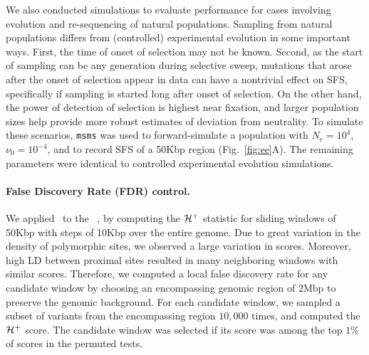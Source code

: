 We also conducted simulations to evaluate performance for cases
involving evolution and re-sequencing of natural populations. Sampling
from natural populations differs from (controlled) experimental
evolution in some important ways. First, the time of onset of
selection may not be known. Second, as the start of sampling can be
any generation during selective sweep, mutations that arose after the
onset of selection appear in data can have a nontrivial effect on SFS,
specifically if sampling is started long after onset of selection. On
the other hand, the power of detection of selection is highest near
fixation, and larger population sizes help provide more robust
estimates of deviation from neutrality. To simulate these scenarios,
\texttt{msms} was used to forward-simulate a population with
$N_e=10^4$, $\nu_0=10^{-4}$, and to record SFS of a 50Kbp region
(Fig.~\ref{fig:ee}A). The remaining parameters were identical to
controlled experimental evolution simulations.

\paragraph{False Discovery Rate (FDR) control.} We applied \comale\ to the
\datadm~\cite{orozco2012adaptation}, by computing the ${\cal H}^{+}$
statistic for sliding windows of 50Kbp with steps of 10Kbp over the
entire genome. Due to great variation in the density of polymorphic
sites, we observed a large variation in scores. Moreover, high LD
between proximal sites resulted in many neighboring windows with
similar scores. Therefore, we computed a local false discovery rate
for any candidate window by choosing an encompassing genomic region of
$2$Mbp to preserve the genomic background. For each candidate window,
we sampled a subset of variants from the encompassing region $10,000$
times, and computed the ${\cal H}^+$ score. The candidate window was
selected if its score was among the top $1\%$ of scores in the
permuted tests.
